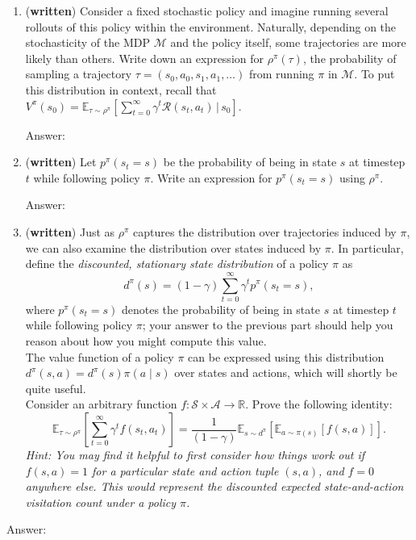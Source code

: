 \documentclass{article}
\begin{document}
\begin{enumerate}
	\item [(a) (3 pts)] (\textbf{written}) Consider a fixed stochastic policy and imagine running several rollouts of this policy within the environment. Naturally, depending on the stochasticity of the MDP $\mathcal{M}$ and the policy itself, some trajectories are more likely than others. Write down an expression for $\rho^\pi(\tau)$, the probability of sampling a trajectory $\tau = (s_0,a_0,s_1,a_1,\ldots)$ from running $\pi$ in $\mathcal{M}$. To put this distribution in context, recall that $V^\pi(s_0) = \mathbb{E}_{\tau \sim \rho^\pi}\left[\sum\limits_{t=0}^\infty \gamma^t \mathcal{R}(s_t,a_t) \,|\, s_0\right].$ 

 \begin{tcolorbox}[breakable]
Answer: 
\end{tcolorbox}
\clearpage

\item [(b) (1 pt)] (\textbf{written}) Let $p^\pi(s_t = s)$ be the probability of being in state $s$ at timestep $t$ while following policy $\pi$. Write an expression for $p^\pi(s_t = s)$ using $\rho^\pi$.

\begin{tcolorbox}[breakable]
Answer: 
\end{tcolorbox}
\clearpage

	\item [(c) (5 pts)] (\textbf{written}) Just as $\rho^\pi$ captures the distribution over trajectories induced by $\pi$, we can also examine the distribution over states induced by $\pi$. In particular, define the \textit{discounted, stationary state distribution} of a policy $\pi$ as $$d^\pi(s) = (1-\gamma) \sum\limits_{t=0}^\infty \gamma^t p^{\pi}(s_t = s),$$ where $p^\pi(s_t = s)$ denotes the probability of being in state $s$ at timestep $t$ while following policy $\pi$; your answer to the previous part should help you reason about how you might compute this value. 
\\
The value function of a policy $\pi$ can be expressed using this distribution $d^{\pi}(s,a) = d^{\pi}(s) \pi(a \mid s)$ over states and actions, which will shortly be quite useful.
 \\
 Consider an arbitrary function $f: \mathcal{S} \times \mathcal{A} \rightarrow \mathbb{R}$. Prove the following identity: $$\mathbb{E}_{\tau \sim \rho^\pi}\left[\sum\limits_{t=0}^\infty \gamma^t f(s_t,a_t)\right] = \frac{1}{(1-\gamma)} \mathbb{E}_{s \sim d^\pi}\left[\mathbb{E}_{a \sim \pi(s)}\left[f(s,a)\right]\right] .$$ 
	\emph{Hint: You may find it helpful to first consider how things work out if $f(s,a) = 1$ for a particular state and action tuple $(s, a)$, and $f=0$ anywhere else. This would represent the discounted expected state-and-action visitation count under a policy $\pi$.}
\end{enumerate}	
\begin{tcolorbox}[breakable]
Answer: 
\end{tcolorbox}
\clearpage
\end{document}
